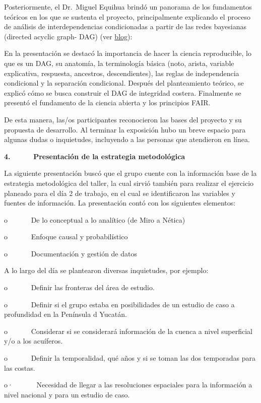 \documentclass[
  letterpaper,
  DIV=11,
  numbers=noendperiod]{scrreprt}
\begin{document}
Posteriormente, el Dr.~Miguel Equihua brindó un panorama de los
fundamentos teóricos en los que se sustenta el proyecto, principalmente
explicando el proceso de análisis de interdependencias condicionadas a
partir de las redes bayesianas (directed acyclic graph- DAG) (ver
\href{https://sw-costas-arenosas.netlify.app/presentaciones\#category=presentaci\%C3\%B3n}{blog}):

En la presentación se destacó la importancia de hacer la ciencia
reproducible, lo que es un DAG, su anatomía, la terminología básica
(noto, arista, variable explicativa, respuesta, ancestros,
descendientes), las reglas de independencia condicional y la separación
condicional. Después del planteamiento teórico, se explicó cómo se busca
construir el DAG de integridad costera. Finalmente se presentó el
fundamento de la ciencia abierta y los principios FAIR.

De esta manera, las/os participantes reconocieron las bases del proyecto
y su propuesta de desarrollo. Al terminar la exposición hubo un breve
espacio para algunas dudas o inquietudes, incluyendo a las personas que
atendieron en línea.

\textbf{4.~~~~~ Presentación de la estrategia metodológica}

La siguiente presentación buscó que el grupo cuente con la información
base de la estrategia metodológica del taller, la cual sirvió también
para realizar el ejercicio planeado para el día 2 de trabajo, en el cual
se identificaron las variables y fuentes de información. La presentación
contó con los siguientes elementos:

o~~~~~~ De lo conceptual a lo analítico (de Miro a Nética)

o~~~~~~ Enfoque causal y probabilístico

o~~~~~~ Documentación y gestión de datos

A lo largo del día se plantearon diversas inquietudes, por ejemplo:

o~~~~~~ Definir las fronteras del área de estudio.

o~~~~~~ Definir si el grupo estaba en posibilidades de un estudio de
caso a profundidad en la Península d Yucatán.

o~~~~~~ Considerar si se considerará información de la cuenca a nivel
superficial y/o a los acuíferos.

o~~~~~~ Definir la temporalidad, qué años y si se toman las dos
temporadas para las costas.

o·~~~~~~ Necesidad de llegar a las resoluciones espaciales para la
información a nivel nacional y para un estudio de caso.
\end{document}
